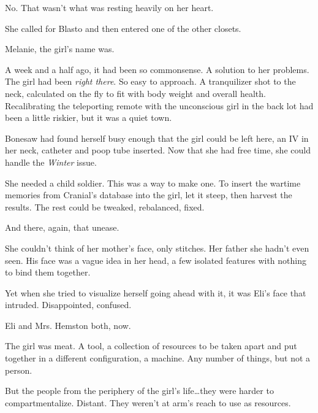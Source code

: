 No.  That wasn't what was resting heavily on her heart.



She called for Blasto and then entered one of the other closets.



Melanie, the girl's name was.



A week and a half ago, it had been so commonsense.  A solution to her problems.  The girl had been \emph{right there}.  So easy to approach.  A tranquilizer shot to the neck, calculated on the fly to fit with body weight and overall health.  Recalibrating the teleporting remote with the unconscious girl in the back lot had been a little riskier, but it was a quiet town.



Bonesaw had found herself busy enough that the girl could be left here, an IV in her neck, catheter and poop tube inserted.  Now that she had free time, she could handle the \emph{Winter} issue.



She needed a child soldier.  This was a way to make one.  To insert the wartime memories from Cranial's database into the girl, let it steep, then harvest the results.  The rest could be tweaked, rebalanced, fixed.



And there, again, that unease.



She couldn't think of her mother's face, only stitches.  Her father she hadn't even seen.  His face was a vague idea in her head, a few isolated features with nothing to bind them together.



Yet when she tried to visualize herself going ahead with it, it was Eli's face that intruded.  Disappointed, confused.



Eli and Mrs. Hemston both, now.



The girl was meat.  A tool, a collection of resources to be taken apart and put together in a different configuration, a machine.  Any number of things, but not a person.



But the people from the periphery of the girl's life\ldots they were harder to compartmentalize.  Distant.  They weren't at arm's reach to use as resources.



